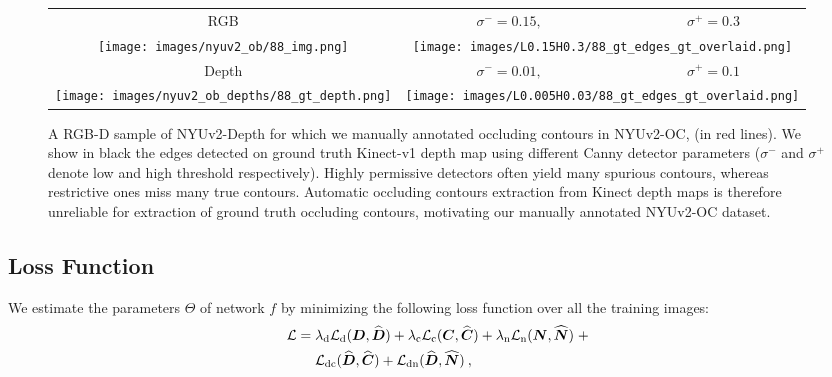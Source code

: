\documentclass[10pt,twocolumn,letterpaper]{article}
\begin{document}
\begin{figure}[h]
	\begin{center}
\begin{tabular}{|@{\hskip 0.2in}c@{\hskip 
			0.2in}||cc|}				
				\hline
				RGB & $\sigma^{-}=0.15,$ & 
				$\sigma^{+}=0.3$ \\ 
				\texttt{[image: images/nyuv2\_ob/88\_img.png]}
				 & 
				\multicolumn{2}{c|}{\texttt{[image: images/L0.15H0.3/88\_gt\_edges\_gt\_overlaid.png]}}
				\\								
				\hline
				Depth & $\sigma^{-}=0.01,$ & $\sigma^{+}=0.1$ \\				
				\texttt{[image: images/nyuv2\_ob\_depths/88\_gt\_depth.png]}
				 &
				\multicolumn{2}{c|}{\texttt{[image: images/L0.005H0.03/88\_gt\_edges\_gt\_overlaid.png]}}
				 \\
				\hline
		\end{tabular}
\end{center}
	\caption{A RGB-D sample of NYUv2-Depth for which we manually annotated 
	occluding contours in NYUv2-OC, (in red lines). We show in black the edges 
	detected on ground truth Kinect-v1 depth map using different Canny detector 
	parameters ($\sigma^{-}$  and $\sigma^{+}$ denote low and high threshold 
	respectively). Highly permissive detectors often yield many spurious 
	contours, whereas restrictive ones miss many true contours. Automatic 
	occluding contours extraction from Kinect depth maps is therefore 
	unreliable for extraction of ground truth occluding contours, motivating 
	our 	manually annotated NYUv2-OC dataset.}
	\label{fig:multi_canny}	
\end{figure}

\subsection{Loss Function}

We estimate the parameters $\Theta$ of network $f$ by minimizing the following 
loss function over all the training images:
\begin{align}
\mathcal{L} = &\; \lambda_{\text{d}} \mathcal{L}_{\text{d}}(\boldsymbol{D}, \widehat{\boldsymbol{D}}) + \lambda_{\text{c}}  
\mathcal{L}_{\text{c}}(\boldsymbol{C}, \widehat{\boldsymbol{C}}) + \lambda_{\text{n}} \mathcal{L}_{\text{n}}(\boldsymbol{N}, \widehat{\boldsymbol{N}}) \; 
+ \nonumber\\
&\; \mathcal{L}_{\text{dc}}(\widehat{\boldsymbol{D}}, \widehat{\boldsymbol{C}}) + \mathcal{L}_{\text{dn}}(\widehat{\boldsymbol{D}}, \widehat{\boldsymbol{N}}) \>,
\label{eq:loss_function}
\end{align}
\end{document}
